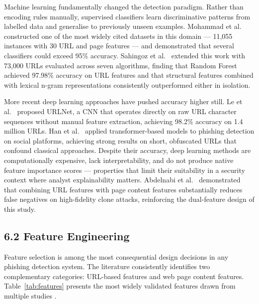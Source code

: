 \documentclass[11pt,letterpaper]{article}
\begin{document}
Machine learning fundamentally changed the detection paradigm. Rather than encoding rules manually, supervised classifiers learn discriminative patterns from labelled data and generalise to previously unseen examples. Mohammad et al.\ \cite{mohammad2014} constructed one of the most widely cited datasets in this domain --- 11,055 instances with 30 URL and page features --- and demonstrated that several classifiers could exceed 95\% accuracy. Sahingoz et al.\ \cite{sahingoz2019} extended this work with 73,000 URLs evaluated across seven algorithms, finding that Random Forest achieved 97.98\% accuracy on URL features and that structural features combined with lexical n-gram representations consistently outperformed either in isolation.

More recent deep learning approaches have pushed accuracy higher still. Le et al.\ \cite{le2018} proposed URLNet, a CNN that operates directly on raw URL character sequences without manual feature extraction, achieving 98.2\% accuracy on 1.4 million URLs. Han et al.\ \cite{han2022} applied transformer-based models to phishing detection on social platforms, achieving strong results on short, obfuscated URLs that confound classical approaches. Despite their accuracy, deep learning methods are computationally expensive, lack interpretability, and do not produce native feature importance scores --- properties that limit their suitability in a security context where analyst explainability matters. Abdelnabi et al.\ \cite{abdelnabi2020} demonstrated that combining URL features with page content features substantially reduces false negatives on high-fidelity clone attacks, reinforcing the dual-feature design of this study.

\subsection*{6.2 Feature Engineering}

Feature selection is among the most consequential design decisions in any phishing detection system. The literature consistently identifies two complementary categories: URL-based features and web page content features. Table~\ref{tab:features} presents the most widely validated features drawn from multiple studies \cite{mohammad2014, sahingoz2019, rao2019}.
\end{document}
